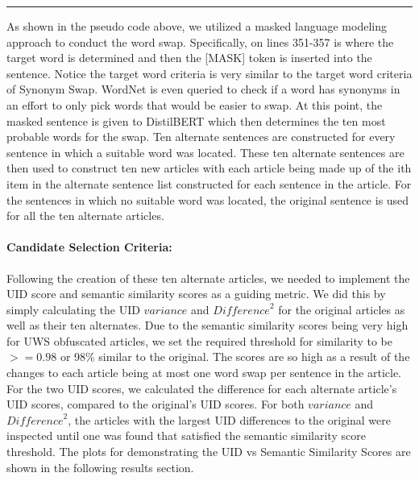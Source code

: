 \documentclass{article}
\begin{document}
\noindent\rule{12cm}{0.4pt}

\hfill \break
As shown in the pseudo code above, we utilized a masked language modeling approach to conduct the word swap. Specifically, on lines 351-357 is where the target word is determined and then the [MASK] token is inserted into the sentence. Notice the target word criteria is very similar to the target word criteria of Synonym Swap. WordNet is even queried to check if a word has synonyms in an effort to only pick words that would be easier to swap. At this point, the masked sentence is given to DistilBERT which then determines the ten most probable words for the swap. Ten alternate sentences are constructed for every sentence in which a suitable word was located. These ten alternate sentences are then used to construct ten new articles with each article being made up of the ith item in the alternate sentence list constructed for each sentence in the article. For the sentences in which no suitable word was located, the original sentence is used for all the ten alternate articles.

\paragraph{Candidate Selection Criteria:} Following the creation of these ten alternate articles, we needed to implement the UID score and semantic similarity scores as a guiding metric. We did this by simply calculating the UID $variance$ and ${Difference}^2$ for the original articles as well as their ten alternates. Due to the semantic similarity scores being very high for UWS obfuscated articles, we set the required threshold for similarity to be $>= 0.98$ or 98\% similar to the original. The scores are so high as a result of the changes to each article being at most one word swap per sentence in the article. For the two UID scores, we calculated the difference for each alternate article's UID scores, compared to the original's UID scores. For both $variance$ and ${Difference}^2$, the articles with the largest UID differences to the original were inspected until one was found that satisfied the semantic similarity score threshold. The plots for demonstrating the UID vs Semantic Similarity Scores are shown in the following results section.
\end{document}
